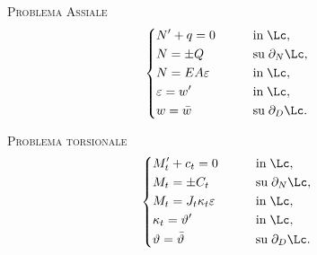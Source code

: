 \vspace{.3cm} 
 
\noindent\textsc{Problema Assiale}\\
 \begin{equation}
 \begin{cases}
 \begin{aligned}
& N'+q=0 \qquad &&\textrm{in}\; \Lc,\\
& N=\pm Q &&\textrm{su}\; \partial_N\Lc,\\
& N=EA \varepsilon &&\textrm{in}\; \Lc,\\
& \varepsilon=w' &&\textrm{in}\; \Lc,\\
& w=\bar{w} &&\textrm{su}\; \partial_D\Lc.\\
\end{aligned} 
 \end{cases}
 \end{equation} 
 
 \vspace{.3cm} 
 
 \noindent\textsc{Problema torsionale}\\
 \begin{equation}
 	\begin{cases}
 		\begin{aligned}
 			& M_t'+c_t=0 \qquad &&\textrm{in}\; \Lc,\\
 			& M_t=\pm C_t &&\textrm{su}\; \partial_N\Lc,\\
 			& M_t=J_t \kappa_t \varepsilon &&\textrm{in}\; \Lc,\\
 			& \kappa_t=\vartheta' &&\textrm{in}\; \Lc,\\
 			& \vartheta=\bar{\vartheta} &&\textrm{su}\; \partial_D\Lc.\\
 		\end{aligned} 
 	\end{cases}
 \end{equation} 
 
  \vspace{.3cm} 
 
